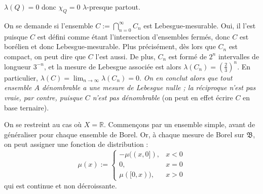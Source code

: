 \begin{example}
    $\lambda(Q) = 0$ donc $\chi_Q = 0$ $\lambda$-presque partout.
\end{example}

\begin{example}
    \begin{figure}[H]
        \centering
    \end{figure}
    On se demande si l'ensemble $C := \bigcap_{n=0}^\infty C_n$ est Lebesgue-mesurable. Oui, il l'est puisque $C$ est défini comme étant l'intersection d'ensembles fermés, donc $C$ est borélien et donc Lebesgue-mesurable. Plus précisément, dès lors que $C_n$ est compact, on peut dire que $C$ l'est aussi. De plus, $C_n$ est formé de $2^n$ intervalles de longueur $3^{-n}$, et la mesure de Lebesgue associée est alors $\lambda(C_n) = \left(\frac{2}{3}\right)^n$. En particulier, $\lambda(C) = \lim_{n\to\infty} \lambda(C_n) = 0$. \textit{On en conclut alors que tout ensemble $A$ dénombrable a une mesure de Lebesgue nulle ; la réciproque n'est pas vraie, par contre, puisque $C$ n'est pas dénombrable} (on peut en effet écrire $C$ en base ternaire).
\end{example}

\begin{definition}
    On se restreint au cas où $X=\mathbb{R}$. Commençons par un ensemble simple, avant de généraliser pour chaque ensemble de Borel. Or, à chaque mesure de Borel sur $\mathfrak{B}$, on peut assigner une fonction de distribution :
    \begin{equation}
        \mu(x) := \left\{ \begin{array}{ll}
            -\mu((x,0]), & x<0 \\
            0, & x=0 \\
            \mu([0,x)), & x>0
        \end{array} \right.
    \end{equation}
    qui est continue et non décroissante.
\end{definition}

